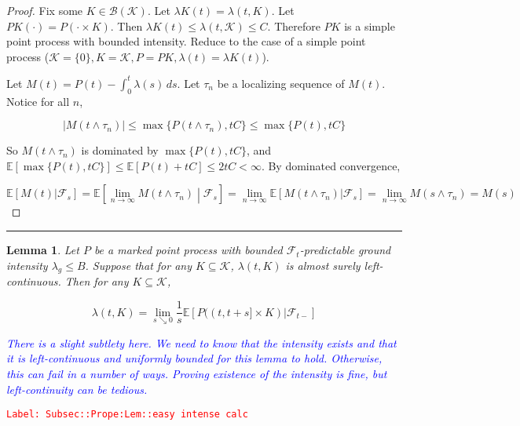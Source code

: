 \documentclass[12pt]{article}
\newcommand{\mb}{\mathbb}
\newcommand{\mc}{\mathcal}
\newcommand{\ms}{\mathscr}
\newcommand{\ra}{\rightarrow}
\newcommand{\tr}{\textcolor{red}}
\newcommand{\tb}{\textcolor{blue}}
\newcommand{\labe}[1]{\tr{\texttt{Label: #1}}}
\newcommand{\lin}{\rule{\linewidth}{0.4 pt}}
\newcommand{\ex}[1]{\mb{E}\left[#1\right]}			%
\renewcommand{\t}{t}							%
\renewcommand{\tt}{s}							%
\newcommand{\F}{\mc{F}}							%
\newcommand{\ts}[1]{_{#1}}						%
\newcommand{\const}{C}							%
\newcommand{\rate}{\lambda}						%
\newcommand{\indx}[1]{_{#1}}					%
\newcommand{\rt}{\tau}							%
\newcommand{\rp}{P}								%
\newcommand{\mspce}{\mc{K}}						%
\newtheorem{lem}[thms]{Lemma}
\begin{document}
\begin{proof}
Fix some \(K \in \ms{B}(\mspce)\). Let \(\rate{K}(\t) = \rate(\t,K)\). Let \(\rp{K}(\cdot) = \rp(\cdot\times K)\). Then \(\rate{K}(\t) \leq \rate(\t,\mspce) \leq \const\). Therefore \(\rp{K}\) is a simple point process with bounded intensity. Reduce to the case of a simple point process (\(\mspce = \{0\}, K = \mspce, \rp = \rp{K},\rate(\t) = \rate{K}(\t)\)).

Let \(M(\t) = \rp(\t) - \int_0^\t \rate(\tt)\,ds\). Let \(\rt\indx{n}\) be a localizing sequence of \(M(\t)\). Notice for all \(n\),

\[|M(\t\wedge \rt\indx{n})| \leq \max\{\rp(\t\wedge \rt\indx{n}),\t\const\}\leq \max\{\rp(\t),\t\const\}\]

So \(M(\t\wedge\rt\indx{n})\) is dominated by \(\max\{\rp(\t),\t\const\}\), and \(\ex{\max\{\rp(\t),\t\const\}} \leq \ex{\rp(\t) + \t\const} \leq 2\t\const < \infty\). By dominated convergence,

\[\ex{M(\t)|\F\ts{\tt}} = \ex{\lim_{n\ra\infty} M(\t\wedge \rt\indx{n})\middle|\F\ts{\tt}} = \lim_{n\ra\infty}\ex{M(\t\wedge \rt\indx{n})|\F\ts{\tt}} = \lim_{n\ra\infty} M(\tt\wedge \rt\indx{n}) = M(\tt)\]
\end{proof}

\lin

\begin{lem}
Let \(\rp\) be a marked point process with bounded \(\F\ts{\t}\)-predictable ground intensity \(\rate_g\leq B\). Suppose that for any \(K \subseteq \mspce\), \(\rate(\t,K)\) is almost surely left-continuous. Then for any \(K \subseteq \mspce\),

\[\rate(\t,K) = \lim_{s\searrow 0}\frac{1}{\tt}\ex{\rp((\t,\t+\tt]\times K)|\F\ts{\t-}}\]

\tb{There is a slight subtlety here. We need to know that the intensity exists and that it is left-continuous and uniformly bounded for this lemma to hold. Otherwise, this can fail in a number of ways. Proving existence of the intensity is fine, but left-continuity can be tedious.}

\label{Subsec::Prope:Lem::easy intense calc}
\end{lem}
\labe{Subsec::Prope:Lem::easy intense calc}
\end{document}
